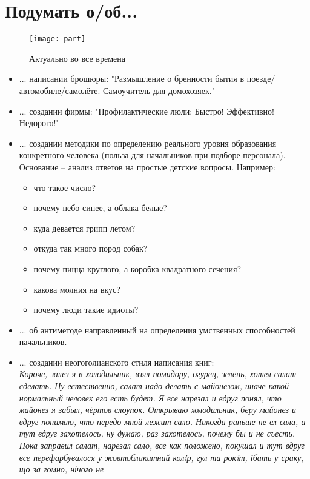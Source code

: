\section{Подумать о/об...}
\begin{figure}[ht!]
    \centering
    \texttt{[image: part]}
    \caption{Актуально во все времена}
\end{figure}
\begin{itemize}
    \item ... написании брошюры: "Размышление о бренности бытия в поезде/автомобиле/самолёте. Самоучитель для домохозяек."
    \item ... создании фирмы: "Профилактические люли: Быстро! Эффективно! Недорого!"
    \item ...  создании методики по определению реального уровня образования конкретного человека (польза для начальников при подборе персонала). Основание -- анализ ответов на простые детские вопросы.
    Например:
        \begin{itemize}
            \item что такое число?
            \item почему небо синее, а облака белые?
            \item куда девается грипп летом?
            \item откуда так много пород собак?
            \item почему пицца круглого, а коробка квадратного сечения?
            \item какова молния на вкус?
            \item почему люди такие идиоты?
        \end{itemize}
    \item ... об антиметоде направленный на определения умственных способностей начальников.    
    \item ... создании неогоголианского стиля написания книг:\\
        \emph{Короче, залез я в холодильник, взял помидору, огурец, зелень, хотел салат сделать. Ну естественно, 
            салат надо делать с майонезом, иначе какой нормальный человек его есть будет. Я все нарезал и вдруг 
            понял, что майонез я забыл, чёртов слоупок. Открываю холодильник, беру майонез и вдруг понимаю, что 
            передо мной лежит сало. Никогда раньше не ел сала, а тут вдруг захотелось, ну думаю, раз захотелось, 
            почему бы и не съесть. Пока заправил салат, нарезал сало, все как положено, покушал и тут вдруг все 
            перефарбувалося у жовтоблакитний колiр, гул та рокiт, їбать у сраку, що за гомно, нічого не 
}
\end{itemize}
